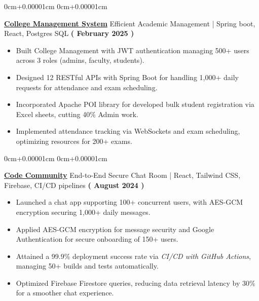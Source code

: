 \documentclass[10pt,a4paper]{article}
\newenvironment{highlights}{
    \begin{itemize}[
        topsep=0.10cm,
        parsep=0.10cm,
        partopsep=0pt,
        itemsep=0pt,
        leftmargin=10pt,
    ]
    }{
    \end{itemize}
}
\newenvironment{onecolentry}{
    \begin{adjustwidth}{
        0cm+0.00001cm
    }{
        0cm+0.00001cm
    }
    }{
    \end{adjustwidth}
}
\begin{document}
    \begin{onecolentry}
        \textbf{\href{https://github.com/Jefino9488/College-Management-Server}{College Management System}} Efficient Academic Management | Spring boot, React, Postgres SQL \hfill \textbf{( February 2025 )} \\
        \begin{highlights}
            \item Built College Management with JWT authentication managing 500+ users across 3 roles (admins, faculty, students). \\
            \item Designed 12 RESTful APIs with Spring Boot for handling 1,000+ daily requests for attendance and exam scheduling. \\
            \item Incorporated Apache POI library for developed bulk student registration via Excel sheets, cutting 40\% Admin work. \\
            \item Implemented attendance tracking via WebSockets and exam scheduling, optimizing resources for 200+ exams. \\
        \end{highlights}
    \end{onecolentry}
    \vspace{0.01cm}
    \begin{onecolentry}
        \textbf{\href{https://github.com/Jefino9488/Code_Community}{Code Community}} End-to-End Secure Chat Room | React, Tailwind CSS, Firebase, CI/CD pipelines \hfill \textbf{( August 2024 )} \\
        \begin{highlights}
            \item Launched a chat app supporting 100+ concurrent users, with AES-GCM encryption securing 1,000+ daily messages. \\
            \item Applied AES-GCM encryption for message security and Google Authentication for secure onboarding of 150+ users. \\
            \item Attained a 99.9\% deployment success rate via \textit{CI/CD with GitHub Actions}, managing 50+ builds and tests automatically. \\
            \item Optimized Firebase Firestore queries, reducing data retrieval latency by 30\% for a smoother chat experience. \\
        \end{highlights}
    \end{onecolentry}
\end{document}
